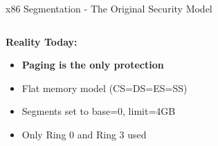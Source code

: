 \documentclass[aspectratio=169,12pt]{beamer}
\begin{document}
\begin{frame}{x86 Segmentation - The Original Security Model}
\begin{columns}
\begin{column}{0.5\textwidth}
            \vspace{0.3cm}
            \begin{tcolorbox}[colback=red!10]
                \textbf{Reality Today:}
                \begin{itemize}
                    \item \textbf{Paging is the only protection}
                    \item Flat memory model (CS=DS=ES=SS)
                    \item Segments set to base=0, limit=4GB
                    \item Only Ring 0 and Ring 3 used
                \end{itemize}
            \end{tcolorbox}
        \end{column}
    \end{columns}
\end{frame}
\end{document}
